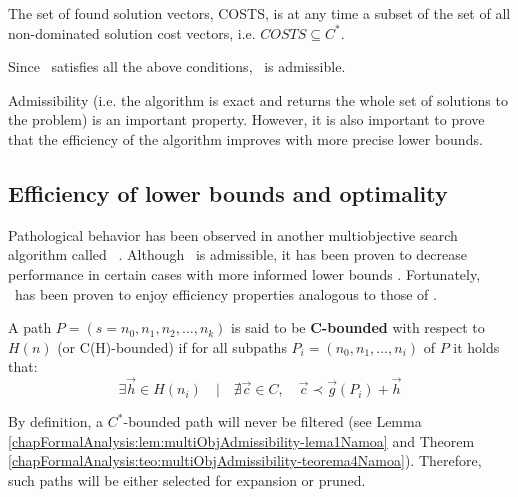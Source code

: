 \begin{corolario} \label{chapFormalAnalysis:corol:multiObjAdmissibility-corolario2Namoa} 
\citep[Corollary 4.7]{Mandow2010}
The set of found solution vectors, COSTS, is at any time a subset of the set of all non-dominated solution cost vectors, i.e. $COSTS \subseteq C^*$.
\end{corolario}

\begin{teorema}\label{chapFormalAnalysis:teo:multiObjAdmissibility-teorema5Namoa} 
\citep[Theorem 4.9]{Mandow2010}
Since \namoa \ satisfies all the above conditions, \namoa \ is admissible.
\end{teorema}

Admissibility (i.e. the algorithm is exact and returns the whole set of solutions to the problem) is an important property. However, it is also important to prove that the efficiency of the algorithm improves with more precise lower bounds. 

\subsection{Efficiency of lower bounds and optimality}
\label{chapFormalAnalysis:sec:efficiencyNamoa}

Pathological behavior has been observed in another multiobjective search algorithm called \moa \ \citep{stewartwhite1991}. Although \moa \ is admissible, it has been proven to decrease performance in certain cases with more informed lower bounds \citep{PerezdelaCruz2013}. Fortunately, \namoa \ has been proven to enjoy efficiency properties analogous to those of \astar.

\begin{defi}\label{chapFormalAnalysis:def:multiObjc-acotado}
\citep[Definition 5.1]{Mandow2010}
A path $P= (s = n_0, n_1, n_2,\ldots, n_k)$ is said to be
\textbf{C-bounded} with respect to $H(n)$ (or C(H)-bounded) if for all subpaths $P_i =(n_0, n_1,\ldots,n_i)$ of $P$ it holds that:
\begin{equation}
\exists \vec h \in H(n_i) \quad | \quad \nexists \vec c \in C, \quad
\vec c \prec \vec g(P_i) + \vec h   
\end{equation}
\end{defi}

By definition, a $C^*$-bounded path will never be filtered (see Lemma \ref{chapFormalAnalysis:lem:multiObjAdmissibility-lema1Namoa} and Theorem \ref{chapFormalAnalysis:teo:multiObjAdmissibility-teorema4Namoa}). Therefore, such paths will be either selected for expansion or pruned.

